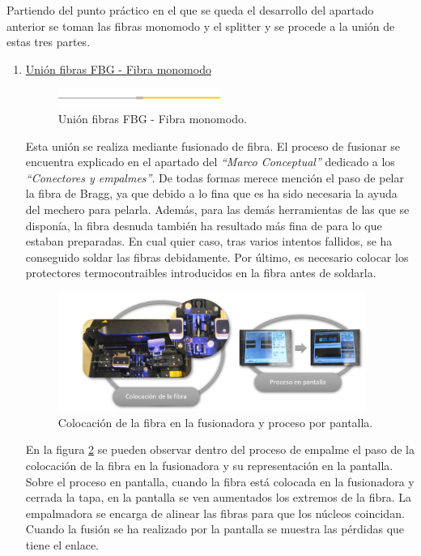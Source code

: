 \begin{itemize}
	Partiendo del punto práctico en el que se queda el desarrollo del apartado anterior se toman las fibras monomodo y el splitter y se procede a la unión de estas tres partes. 
	
	\begin{enumerate}
		\item \underline{Unión fibras FBG - Fibra monomodo}
		
	\begin{figure}[H]
		\centering
		\includegraphics[width=0.5\textwidth]{./img/union1}
		\caption{Unión fibras FBG - Fibra monomodo.} 
		\label{fig:union1}
	\end{figure}  
	
	Esta unión se realiza mediante fusionado de fibra. El proceso de fusionar se encuentra explicado en el apartado del \textit{``Marco Conceptual''} dedicado a los \textit{``Conectores y empalmes''}. De todas formas merece mención el paso de pelar la fibra de Bragg, ya que debido a lo fina que es ha sido necesaria la ayuda del mechero para pelarla. Además, para las demás herramientas de las que se disponía, la fibra desnuda también ha resultado más fina de para lo que estaban preparadas. En cual quier caso, tras varios intentos fallidos, se ha conseguido soldar las fibras debidamente. Por último, es necesario colocar los protectores termocontraibles introducidos en la fibra antes de soldarla.
	
	\begin{figure}[H]
		\centering
		\includegraphics[width=0.95\textwidth]{./img/fusionFOpractica}
		\caption{Colocación de la fibra en la fusionadora y proceso por pantalla.} 
		\label{fig:fusionadora}
	\end{figure}  
	
	En la figura \ref{fig:fusionadora} se pueden observar dentro del proceso de empalme el paso de la colocación de la fibra en la fusionadora y su representación en la pantalla. Sobre el proceso en pantalla, cuando la fibra está colocada en la fusionadora y cerrada la tapa, en la pantalla se ven aumentados los extremos de la fibra. La empalmadora se encarga de alinear las fibras para que los núcleos coincidan. Cuando la fusión se ha realizado por la pantalla se muestra las pérdidas que tiene el enlace.  
	

\end{enumerate}
\end{itemize}
